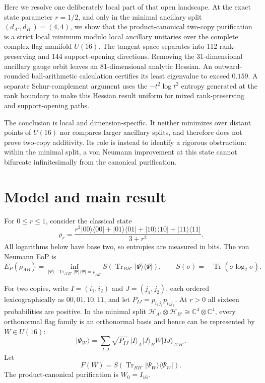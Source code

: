 \documentclass[11pt]{article}
\newcommand{\Tr}{\operatorname{Tr}}
\newcommand{\cH}{\mathcal{H}}
\newcommand{\ket}[1]{\lvert #1\rangle}
\newcommand{\proj}[1]{\lvert #1\rangle\!\langle #1\rvert}
\begin{document}
Here we resolve one deliberately local part of that open landscape.  At the
exact state parameter $r=1/2$, and only in the minimal ancillary split
$(d_{A'},d_{B'})=(4,4)$, we show that the product-canonical two-copy
purification is a strict local minimum modulo local ancillary unitaries over
the complete complex flag manifold $U(16)$.  The tangent space separates
into 112 rank-preserving and 144 support-opening directions.  Removing the
31-dimensional ancillary gauge orbit leaves an 81-dimensional analytic
Hessian.  An outward-rounded ball-arithmetic calculation certifies its least
eigenvalue to exceed $0.159$.  A separate Schur-complement argument uses the
$-t^2\log t^2$ entropy generated at the rank boundary to make this Hessian
result uniform for mixed rank-preserving and support-opening paths.

The conclusion is local and dimension-specific.  It neither minimizes over
distant points of $U(16)$ nor compares larger ancillary splits, and therefore
does not prove two-copy additivity.  Its role is instead to identify a
rigorous obstruction: within the minimal split, a von Neumann improvement at
this state cannot bifurcate infinitesimally from the canonical purification.

\section{Model and main result}

For $0\leq r\leq1$, consider the classical state
\begin{equation}
 \rho_r=\frac{r^2\proj{00}+\proj{01}+\proj{10}+\proj{11}}{3+r^2}.
 \label{eq:state}
\end{equation}
All logarithms below have base two, so entropies are measured in bits.  The
von Neumann EoP is
\begin{equation}
 E_P(\rho_{AB})=\inf_{\ket{\Psi}:\,\Tr_{A'B'}\proj{\Psi}=\rho_{AB}}
 S\!\left(\Tr_{BB'}\proj{\Psi}\right),\qquad
 S(\sigma)=-\Tr(\sigma\log_2\sigma).
 \label{eq:eop}
\end{equation}

For two copies, write $I=(i_1,i_2)$ and $J=(j_1,j_2)$, each ordered
lexicographically as $00,01,10,11$, and let
$P_{IJ}=p_{i_1j_1}p_{i_2j_2}$.  At $r>0$ all sixteen probabilities are
positive.  In the minimal split $\cH_{A'}\otimes\cH_{B'}\cong
\mathbb C^4\otimes\mathbb C^4$, every orthonormal flag family is an
orthonormal basis and hence can be represented by $W\in U(16)$:
\begin{equation}
 \ket{\Psi_W}=\sum_{I,J}\sqrt{P_{IJ}}\,\ket{I}_A\ket{J}_B
 W\ket{IJ}_{A'B'}.
 \label{eq:flags}
\end{equation}
Let
\begin{equation}
 F(W)=S\!\left(\Tr_{BB'}\proj{\Psi_W}\right).
 \label{eq:objective}
\end{equation}
The product-canonical purification is $W_0=I_{16}$.
\end{document}
